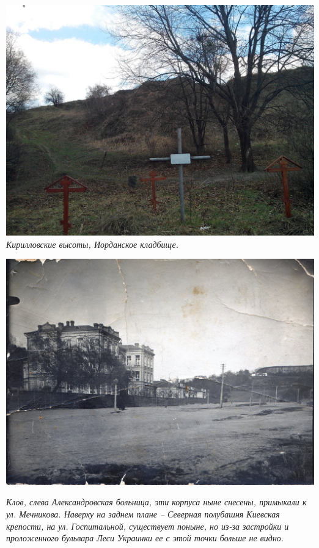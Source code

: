 \begin{center}
\includegraphics[width=\linewidth]{rpix/IMG_20160330_153049.jpg}
\textit{Кирилловские высоты, Иорданское кладбище.}
\end{center}



\vspace*{\fill}

\begin{center}
\includegraphics[width=\linewidth]{rpix/alb.jpg}

\textit{Клов, слева Александровская больница, эти корпуса ныне снесены, примыкали к ул. Мечникова. Наверху на заднем плане – Северная полубашня Киевская крепости, на ул. Госпитальной, существует поныне, но из-за застройки и проложенного бульвара Леси Украинки ее с этой точки больше не видно.}
\end{center}
\vspace*{\fill}

